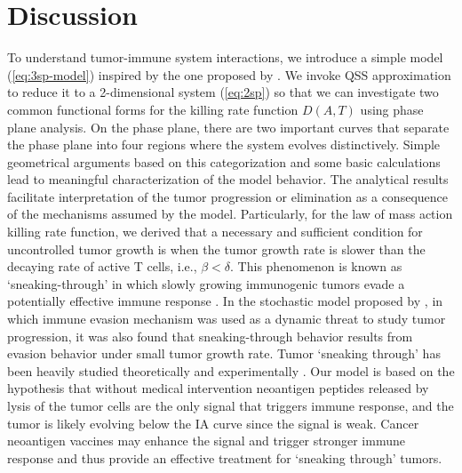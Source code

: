 \documentclass[review,authoryear]{elsarticle}
\begin{document}
\section{Discussion\label{sec:Discussion}}
To understand tumor-immune system interactions, we introduce a simple model (\ref{eq:3sp-model}) inspired by the one proposed by \citet{Messan2021}. We invoke QSS approximation to reduce it to a 2-dimensional system (\ref{eq:2sp}) so that we can investigate two common functional forms for the killing rate function $D(A,T)$ using phase plane analysis. On the phase plane, there are two important curves that separate the phase plane into four regions where the system evolves distinctively. Simple geometrical arguments based on this categorization and some basic
calculations lead to meaningful characterization of the model behavior.
The analytical results facilitate interpretation of the tumor
progression or elimination as a consequence of the mechanisms assumed by the model.
Particularly, for the law of mass action killing rate function, we derived
that a necessary and sufficient condition
for uncontrolled tumor growth is when the tumor growth rate is slower than the
decaying rate of active T cells, i.e., $\beta<\delta$. This phenomenon is known as `sneaking-through' in which slowly growing immunogenic tumors evade a potentially effective immune response \citet{bocharov2004underwhelming}. In the stochastic model proposed by \cite{George2018}, in which immune evasion mechanism was used as a dynamic threat to study tumor progression, it was also found that sneaking-through behavior results from evasion behavior under small tumor growth rate. Tumor `sneaking through' has been heavily studied theoretically
and experimentally \citep[see e.g.][for a review]{Wilkie2013}. 
 Our model is based on the hypothesis that without medical intervention neoantigen peptides released by lysis of the tumor cells are the only signal that triggers immune response, and the tumor is likely evolving below the IA curve since the signal is weak. Cancer neoantigen vaccines may enhance the signal and trigger stronger immune response and thus provide an effective treatment for `sneaking through' tumors.   
\end{document}
